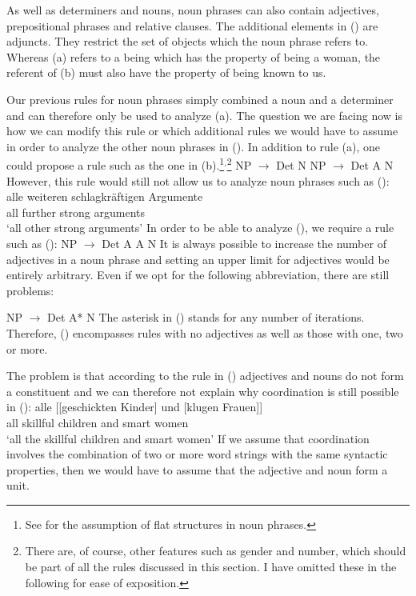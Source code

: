\noindent
As well as determiners and nouns, noun phrases can also contain adjectives, prepositional phrases and relative clauses. 
The additional elements in () are adjuncts. They restrict the set of objects which the noun phrase 
refers to. Whereas (a) refers to a being which has the property of being a woman, the referent of (b) must
also have the property of being known to us.

Our previous rules for noun phrases simply combined a noun and a determiner and can therefore only be used to
analyze (a). The question we are facing now is how we can modify this rule or which additional rules we would
have to assume in order to analyze the other noun phrases in (). In addition to rule (a), one could propose 
a rule such as the one in (b).\footnote{
	See  for the assumption of flat structures in noun phrases.
}$^,$\footnote{
	There are, of course, other features such as gender and number, which should be part of all the rules
	discussed in this section. I have omitted these in the following for ease of exposition.
}
\eal
\ex NP $\to$ Det N
\ex NP $\to$ Det A N
\zl
However, this rule would still not allow us to analyze noun phrases such as ():
\ea
\label{Beispiel-alle-weitern-schlagkraeftigen-Argumente}
\gll alle weiteren schlagkräftigen Argumente\\
	 all further strong arguments\\
\glt `all other strong arguments'
\z
In order to be able to analyze (), we require a rule such as (): 
\ea 
NP $\to$ Det A A N
\z
It is always possible to increase the number of adjectives in a noun phrase and setting an upper limit for
adjectives would be entirely arbitrary. Even if we opt for the following abbreviation, there are still problems:

\ea 
NP $\to$ Det A* N
\z
The asterisk\is{*} in () stands for any number of iterations. Therefore, () encompasses rules with no adjectives
as well as those with one, two or more.

\addlines[2]
The problem is that according to the rule in () adjectives and nouns do not form a constituent and we can therefore not explain why coordination 
is still possible in ():
\ea
\gll alle [[geschickten Kinder] und [klugen Frauen]]\\
	 all  \spacebr{}\spacebr{}skillful children and  \spacebr{}smart women\\
\glt `all the skillful children and smart women'	 
\z
If we assume that coordination involves the combination of two or more word strings with the same syntactic properties, then we would have to assume
that the adjective and noun form a unit.

